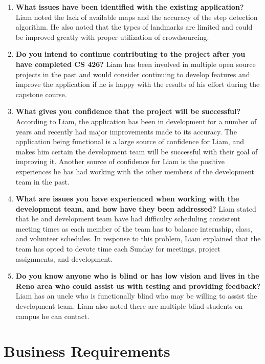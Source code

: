 \documentclass{scrreprt}
\begin{document}
\begin{enumerate}
\item \textbf{What issues have been identified with the existing application?}
Liam noted the lack of available maps and the accuracy of the step detection algorithm. He also noted that the types of landmarks are limited and could be improved greatly with proper utilization of crowdsourcing.


\item \textbf{Do you intend to continue contributing to the project after you have completed CS 426?}
Liam has been involved in multiple open source projects in the past and would consider continuing to develop features and improve the application if he is happy with the results of his effort during the capstone course.


\item \textbf{What gives you confidence that the project will be successful?}
According to Liam, the application has been in development for a number of years and recently had major improvements made to its accuracy. The application being functional is a large source of confidence for Liam, and makes him certain the development team will be successful with their goal of improving it. Another source of confidence for Liam is the positive experiences he has had working with the other members of the development team in the past. 


\item \textbf{What are issues you have experienced when working with the development team, and how have they been addressed?}
Liam stated that he and development team have had difficulty scheduling consistent meeting times as each member of the team has to balance internship, class, and volunteer schedules. In response to this problem, Liam explained that the team has opted to devote time each Sunday for meetings, project assignments, and development.


\item \textbf{Do you know anyone who is blind or has low vision and lives in the Reno area who could assist us with testing and providing feedback?}
Liam has an uncle who is functionally blind who may be willing to assist the development team. Liam also noted there are multiple blind students on campus he can contact.

\end{enumerate}
 

\chapter{Business Requirements}
\end{document}
